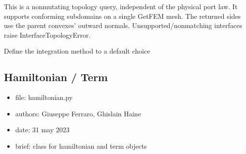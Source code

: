 \documentclass[letterpaper,10pt,english]{sphinxmanual}
\begin{document}
\begin{fulllineitems}
\begin{fulllineitems}
\sphinxAtStartPar
This is a non\sphinxhyphen{}mutating topology query, independent of the physical
port law. It supports conforming subdomains on a single GetFEM mesh.
The returned sides use the parent convexes’ outward normals.
Unsupported/non\sphinxhyphen{}matching interfaces raise InterfaceTopologyError.

\end{fulllineitems}


\begin{fulllineitems}
\label{\detokenize{scrimp:scrimp.domain.Domain.set_mim_auto}}
\pysigstartsignatures
\pysiglinewithargsret
{}
{}
{}
\pysigstopsignatures
\sphinxAtStartPar
Define the integration method to a default choice

\end{fulllineitems}


\end{fulllineitems}



\subsection{Hamiltonian / Term}
\label{\detokenize{scrimp:module-scrimp.hamiltonian}}\label{\detokenize{scrimp:hamiltonian-term}}\begin{itemize}
\item {} 
\sphinxAtStartPar
file:             hamiltonian.py

\item {} 
\sphinxAtStartPar
authors:          Giuseppe Ferraro, Ghislain Haine

\item {} 
\sphinxAtStartPar
date:             31 may 2023

\item {} 
\sphinxAtStartPar
brief:            class for hamiltonian and term objects

\end{itemize}
\end{document}
